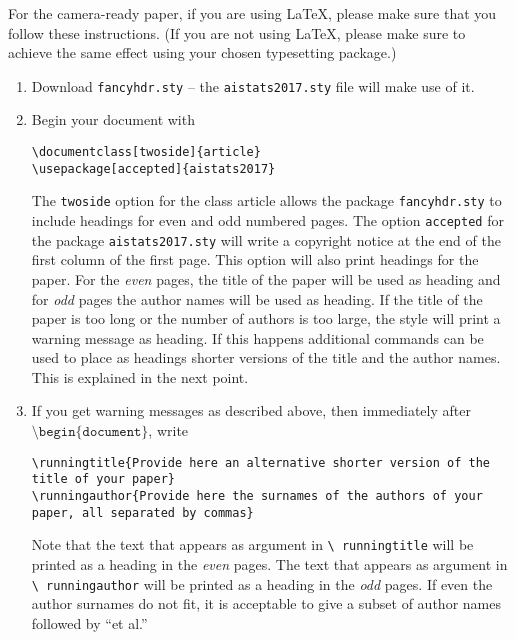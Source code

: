 \documentclass[twoside]{article} \usepackage{aistats2017}
\begin{document}
For the camera-ready paper, if you are using \LaTeX, please make sure
that you follow these instructions.  (If you are not using \LaTeX,
please make sure to achieve the same effect using your chosen
typesetting package.)

\begin{enumerate}
    \item Download \texttt{fancyhdr.sty} -- the
    \texttt{aistats2017.sty} file will make use of it.
    \item Begin your document with
    \begin{flushleft}
    \texttt{\textbackslash documentclass[twoside]\{article\}}\\
    \texttt{\textbackslash usepackage[accepted]\{aistats2017\}}
    \end{flushleft}
    The \texttt{twoside} option for the class article allows the
    package \texttt{fancyhdr.sty} to include headings for even and odd
    numbered pages. The option \texttt{accepted} for the package
    \texttt{aistats2017.sty} will write a copyright notice at the end of
    the first column of the first page. This option will also print
    headings for the paper.  For the \emph{even} pages, the title of
    the paper will be used as heading and for \emph{odd} pages the
    author names will be used as heading.  If the title of the paper
    is too long or the number of authors is too large, the style will
    print a warning message as heading. If this happens additional
    commands can be used to place as headings shorter versions of the
    title and the author names. This is explained in the next point.
    \item  If you get warning messages as described above, then
    immediately after $\texttt{\textbackslash
    begin\{document\}}$, write
    \begin{flushleft}
    \texttt{\textbackslash runningtitle\{Provide here an alternative shorter version of the title of your
    paper\}}\\
    \texttt{\textbackslash runningauthor\{Provide here the surnames of the authors of your paper, all separated by
    commas\}}
    \end{flushleft}
    Note that the text that appears as argument in \texttt{\textbackslash
      runningtitle} will be printed as a heading in the \emph{even}
    pages. The text that appears as argument in \texttt{\textbackslash
      runningauthor} will be printed as a heading in the \emph{odd}
    pages.  If even the author surnames do not fit, it is acceptable
    to give a subset of author names followed by ``et al.''


\end{enumerate}
\end{document}

